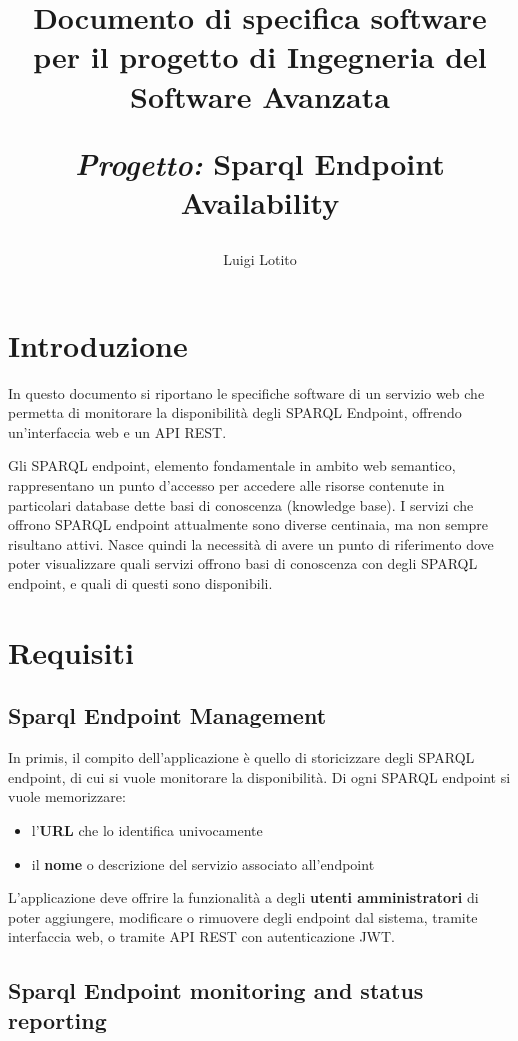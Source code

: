 \documentclass{article}
\title{Documento di specifica software per il progetto di Ingegneria del Software Avanzata\par
    \textit{Progetto:} \textbf{Sparql Endpoint Availability}\\}
\author{Luigi Lotito}
\date{}
\begin{document}
\maketitle
\clearpage

\tableofcontents
\clearpage

\section{Introduzione}
\label{sec:introduzione}

In questo documento si riportano le specifiche software di un servizio web che permetta
di monitorare la disponibilità degli SPARQL Endpoint, offrendo un'interfaccia web e un API REST.

Gli SPARQL endpoint, elemento fondamentale in ambito web semantico, rappresentano
un punto d'accesso per accedere  alle risorse contenute in particolari database dette basi di conoscenza (knowledge base).
I servizi che offrono SPARQL endpoint attualmente sono diverse centinaia, ma non sempre risultano attivi.
Nasce quindi la necessità di avere un punto di riferimento dove poter visualizzare
quali servizi offrono basi di conoscenza con degli SPARQL endpoint, e quali di questi sono disponibili.


\section{Requisiti}
\label{sec:requisiti}

\subsection{Sparql Endpoint Management}

In primis, il compito dell'applicazione è quello di storicizzare degli SPARQL endpoint, di cui si vuole monitorare la disponibilità.
Di ogni SPARQL endpoint si vuole memorizzare:
\begin{itemize}
    \item l'\textbf{URL} che lo identifica univocamente
    \item il \textbf{nome} o descrizione del servizio associato all'endpoint
\end{itemize}

L'applicazione deve offrire la funzionalità a degli \textbf{utenti amministratori} di poter aggiungere, modificare o rimuovere degli endpoint
dal sistema, tramite interfaccia web, o tramite API REST con autenticazione JWT.

\subsection{Sparql Endpoint monitoring and status reporting}
\end{document}
